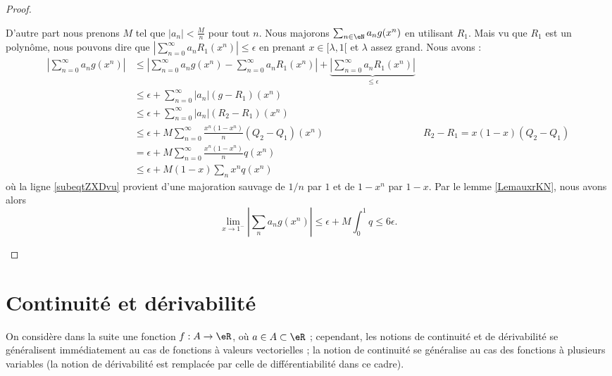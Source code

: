 \begin{proof}
\begin{subproof}
        D'autre part nous prenons \( M\) tel que \( | a_n |<\frac{ M }{ n }\) pour tout \( n\). Nous majorons \( \sum_{n \in \eN}a_ng(x^n)\) en utilisant \( R_1\). Mais vu que \( R_1\) est un polynôme, nous pouvons dire que \( | \sum_{n=0}^{\infty}a_nR_1(x^n) |\leq \epsilon\) en prenant \( x\in\mathopen[ \lambda , 1 [\) et \( \lambda\) assez grand. Nous avons :
        \begin{subequations}
            \begin{align}
                \left| \sum_{n=0}^{\infty}a_ng(x^n) \right| &\leq\left| \sum_{n=0}^{\infty}a_ng(x^n)-\sum_{n=0}^{\infty}a_nR_1(x^n) \right| +\underbrace{\left| \sum_{n=0}^{\infty}a_nR_1(x^n) \right|}_{\leq \epsilon} \\
                &\leq \epsilon+\sum_{n=0}^{\infty}| a_n |(g-R_1)(x^n)\\
                &\leq \epsilon+\sum_{n=0}^{\infty}| a_n |(R_2-R_1)(x^n)\\
                &\leq \epsilon+M\sum_{n=0}^{\infty}\frac{ x^n(1-x^n) }{ n }(Q_2-Q_1)(x^n)   &R_2-R_1=x(1-x)(Q_2-Q_1)\\
                &=\epsilon+M\sum_{n=0}^{\infty}\frac{ x^n(1-x^n) }{ n }q(x^n)\\
                &\leq \epsilon+M(1-x)\sum_nx^nq(x^n)   \label{subeqtZXDvu} 
            \end{align}
        \end{subequations}
        où la ligne \eqref{subeqtZXDvu} provient d'une majoration sauvage de \( 1/n\) par \( 1\) et de \( 1-x^n\) par \( 1-x\). Par le lemme \ref{LemauxrKN}, nous avons alors
        \begin{equation}
            \lim_{x\to 1^-} | \sum_na_ng(x^n) |\leq \epsilon+M\int_0^1q\leq 6\epsilon.
        \end{equation}
    \end{subproof}
\end{proof}


\section{Continuité et dérivabilité}
\label{seccontetderiv}

On considère dans la suite une fonction $f : A \to \eR$, où $a \in A \subset \eR$ ; cependant, les notions de continuité et de dérivabilité se généralisent immédiatement au cas de fonctions à valeurs vectorielles ; la notion de continuité se généralise au cas des fonctions à plusieurs variables (la notion de dérivabilité est remplacée par celle de différentiabilité dans ce cadre).

